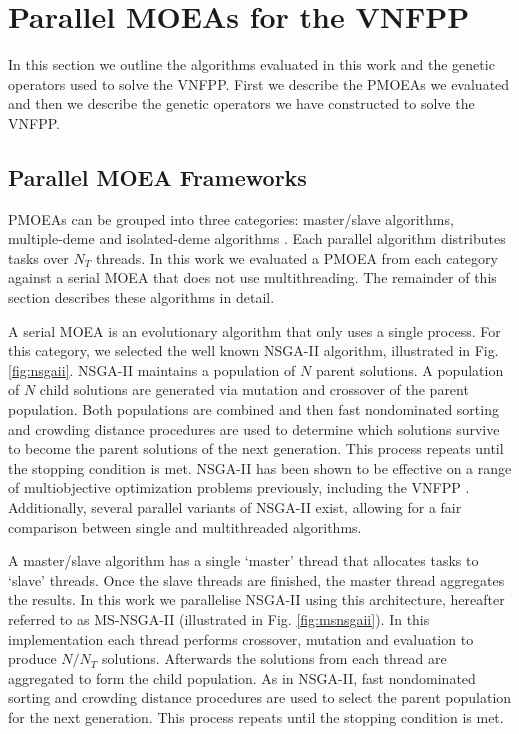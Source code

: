 \section{Parallel MOEAs for the VNFPP}
\label{sec:algorithms}

In this section we outline the algorithms evaluated in this work and the genetic operators used to solve the VNFPP. First we describe the PMOEAs we evaluated and then we describe the genetic operators we have constructed to solve the VNFPP. 

\subsection{Parallel MOEA Frameworks}
PMOEAs can be grouped into three categories: master/slave algorithms, multiple-deme and isolated-deme algorithms \cite{Cantu-PazG99}. Each parallel algorithm distributes tasks over $N_T$ threads. In this work we evaluated a PMOEA from each category against a serial MOEA that does not use multithreading. The remainder of this section describes these algorithms in detail.

A serial MOEA is an evolutionary algorithm that only uses a single process. For this category, we selected the well known NSGA-II \cite{DebAPM00} algorithm, illustrated in Fig. \ref{fig:nsgaii}. NSGA-II maintains a population of $N$ parent solutions. A population of $N$ child solutions are generated via mutation and crossover of the parent population. Both populations are combined and then fast nondominated sorting and crowding distance procedures are used to determine which solutions survive to become the parent solutions of the next generation. This process repeats until the stopping condition is met. NSGA-II has been shown to be effective on a range of multiobjective optimization problems previously, including the VNFPP \cite{BillingsleyLMMG20}. Additionally, several parallel variants of NSGA-II exist, allowing for a fair comparison between single and multithreaded algorithms.

A master/slave algorithm has a single `master' thread that allocates tasks to `slave' threads. Once the slave threads are finished, the master thread aggregates the results. In this work we parallelise NSGA-II using this architecture, hereafter referred to as MS-NSGA-II (illustrated in Fig. \ref{fig:msnsgaii}). In this implementation each thread performs crossover, mutation and evaluation to produce $N / N_T$ solutions. Afterwards the solutions from each thread are aggregated to form the child population. As in NSGA-II, fast nondominated sorting and crowding distance procedures are used to select the parent population for the next generation. This process repeats until the stopping condition is met.

